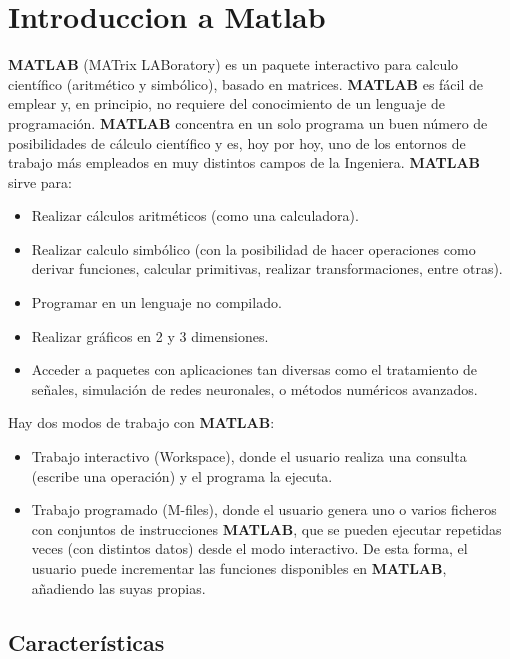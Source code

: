\chapter{Introduccion a Matlab}

\textbf{MATLAB} (MATrix LABoratory) es un paquete interactivo para calculo científico (aritmético y simbólico), basado en matrices. \textbf{MATLAB} es fácil de emplear y, en principio, no requiere del conocimiento de un lenguaje de programación. \textbf{MATLAB} concentra en un solo programa un buen número de posibilidades de cálculo científico y es, hoy por hoy, uno de los entornos de trabajo más empleados en muy distintos campos de la Ingeniera. \textbf{MATLAB} sirve para:
\begin{itemize}
\item Realizar cálculos aritméticos (como una calculadora).
\item Realizar calculo simbólico (con la posibilidad de hacer operaciones como derivar funciones, calcular primitivas, realizar transformaciones, entre otras).
\item Programar en un lenguaje no compilado.
\item Realizar gráficos en 2 y 3 dimensiones.
\item Acceder a paquetes con aplicaciones tan diversas como el tratamiento de señales, simulación de redes neuronales, o métodos numéricos avanzados.
\end{itemize}

Hay dos modos de trabajo con \textbf{MATLAB}:
\begin{itemize}
\item Trabajo interactivo (Workspace), donde el usuario realiza una consulta (escribe una operación) y el programa la ejecuta.
\item Trabajo programado (M-files), donde el usuario genera uno o varios ficheros con conjuntos
de instrucciones \textbf{MATLAB}, que se pueden ejecutar repetidas veces (con distintos datos)
desde el modo interactivo. De esta forma, el usuario puede incrementar las funciones disponibles en \textbf{MATLAB}, añadiendo las suyas propias.
\end{itemize}

\section{Características}

